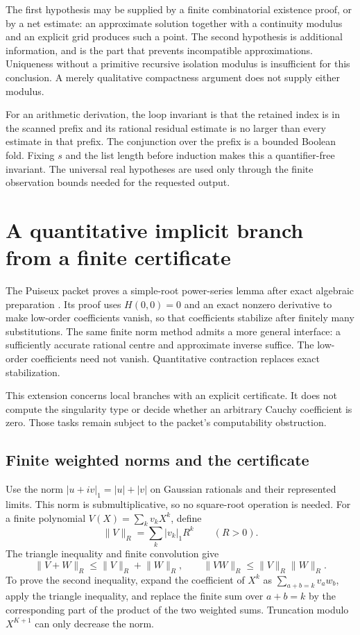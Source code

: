 The first hypothesis may be supplied by a finite combinatorial existence
proof, or by a net estimate: an approximate solution together with a
continuity modulus and an explicit grid produces such a point.  The second
hypothesis is additional information, and is the part that prevents
incompatible approximations.  Uniqueness without a primitive recursive
isolation modulus is insufficient for this conclusion.  A merely
qualitative compactness argument does not supply either modulus.

For an arithmetic derivation, the loop invariant is that the retained index
is in the scanned prefix and its rational residual estimate is no larger
than every estimate in that prefix.  The conjunction over the prefix is a
bounded Boolean fold.  Fixing $s$ and the list length before induction makes
this a quantifier-free invariant.  The universal real hypotheses are used
only through the finite observation bounds needed for the requested output.

\section{A quantitative implicit branch from a finite certificate}
\label{ana:implicit}

The Puiseux packet proves a simple-root power-series lemma after exact
algebraic preparation \cite{repoPuiseux}.  Its proof uses $H(0,0)=0$ and an exact nonzero
derivative to make low-order coefficients vanish, so that coefficients
stabilize after finitely many substitutions.  The same finite norm method
admits a more general interface: a sufficiently accurate rational centre
and approximate inverse suffice.  The low-order coefficients need not
vanish.  Quantitative contraction replaces exact stabilization.

This extension concerns local branches with an explicit certificate.  It
does not compute the singularity type or decide whether an arbitrary
Cauchy coefficient is zero.  Those tasks remain subject to the packet's
computability obstruction.

\subsection{Finite weighted norms and the certificate}

Use the norm $|u+iv|_1=|u|+|v|$ on Gaussian rationals and their represented
limits.  This norm is submultiplicative, so no square-root operation is
needed.  For a finite polynomial $V(X)=\sum_k v_kX^k$, define
\[
 \lVert V\rVert_R=\sum_k |v_k|_1R^k\qquad (R>0).
\]
The triangle inequality and finite convolution give
\begin{equation}
 \lVert V+W\rVert_R\le\lVert V\rVert_R+\lVert W\rVert_R,
 \qquad
 \lVert VW\rVert_R\le\lVert V\rVert_R\lVert W\rVert_R.
 \label{ana:normrules}
\end{equation}
To prove the second inequality, expand the coefficient of $X^k$ as
$\sum_{a+b=k}v_aw_b$, apply the triangle inequality, and replace the
finite sum over $a+b=k$ by the corresponding part of the product of the
two weighted sums.  Truncation modulo $X^{K+1}$ can only decrease the norm.

